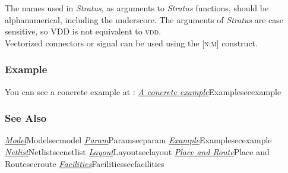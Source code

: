 \indent The names used in \emph{Stratus}, as arguments to \emph{Stratus} functions, should be alphanumerical, including the underscore. The arguments of \emph{Stratus} are case sensitive, so \textsc{VDD} is not equivalent to \textsc{vdd}.\\
    
\indent Vectorized connectors or signal can be used using the \textsc{[n:m]} construct.\\

\subsubsection{Example}

You can see a concrete example at : \hyperref[ref]{\emph{A concrete example}}{}{Example}{secexample}

\subsubsection{See Also}

\hyperref[ref]{\emph{Model}}{}{Model}{secmodel}
\hyperref[ref]{\emph{Param}}{}{Param}{secparam}
\hyperref[ref]{\emph{Example}}{}{Example}{secexample}
\hyperref[ref]{\emph{Netlist}}{}{Netlist}{secnetlist}
\hyperref[ref]{\emph{Layout}}{}{Layout}{seclayout}
\hyperref[ref]{\emph{Place and Route}}{}{Place and Route}{secroute}
\hyperref[ref]{\emph{Facilities}}{}{Facilities}{secfacilities}
